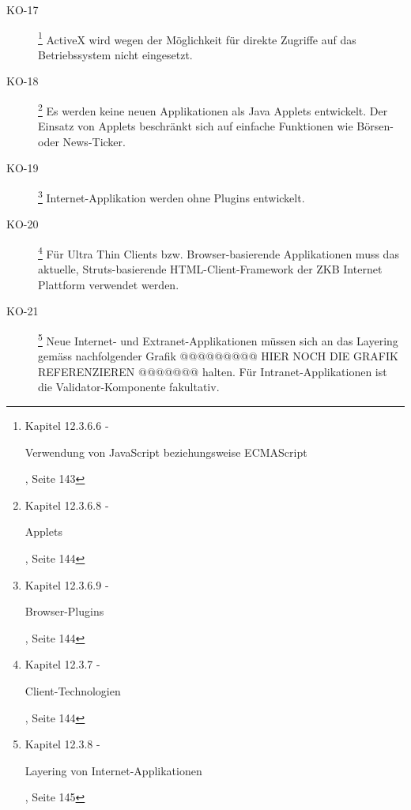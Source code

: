\documentclass[
11pt, %
a4paper, %
BCOR25mm, %
DIV14, %
footsepline = false, %
headsepline, %
twoside, %
openright,
abstracton, %
listof=totocnumbered, %
bibliography=totocnumbered %
]{scrreprt}
\begin{document}
\begin{description}
    \item[KO-17\label{itm:KO-17}]
    \footnote{\cite{ZkbHandbuchDerItArchitektur} Kapitel 12.3.6.6 -
    \begin{itshape}Verwendung von JavaScript beziehungsweise
    ECMAScript\end{itshape}, Seite 143}
    ActiveX wird wegen der Möglichkeit für direkte Zugriffe auf das
    Betriebssystem nicht eingesetzt.
    
    \item[KO-18\label{itm:KO-18}]
    \footnote{\cite{ZkbHandbuchDerItArchitektur} Kapitel 12.3.6.8 -
    \begin{itshape}Applets\end{itshape}, Seite 144}
    Es werden keine neuen Applikationen als Java Applets entwickelt. Der
    Einsatz von Applets beschränkt sich auf einfache Funktionen wie Börsen-
    oder News-Ticker.
    
    \item[KO-19\label{itm:KO-19}]
    \footnote{\cite{ZkbHandbuchDerItArchitektur} Kapitel 12.3.6.9 -
    \begin{itshape}Browser-Plugins\end{itshape}, Seite 144}
    Internet-Applikation werden ohne Plugins entwickelt.
    
    \item[KO-20\label{itm:KO-20}]
    \footnote{\cite{ZkbHandbuchDerItArchitektur} Kapitel 12.3.7 -
    \begin{itshape}Client-Technologien\end{itshape}, Seite 144}
    Für Ultra Thin Clients bzw. Browser-basierende Applikationen muss das
    aktuelle, Struts-basierende HTML-Client-Framework der ZKB Internet
    Plattform verwendet werden.
    
    \item[KO-21\label{itm:KO-21}]
    \footnote{\cite{ZkbHandbuchDerItArchitektur} Kapitel 12.3.8 -
    \begin{itshape}Layering von Internet-Applikationen\end{itshape}, Seite 145}
    Neue Internet- und Extranet-Applikationen müssen sich an das Layering
    gemäss nachfolgender Grafik @@@@@@@@@ HIER NOCH DIE GRAFIK REFERENZIEREN
    @@@@@@@ halten. Für Intranet-Applikationen ist die Validator-Komponente
    fakultativ.
    

\end{description}
\end{document}
